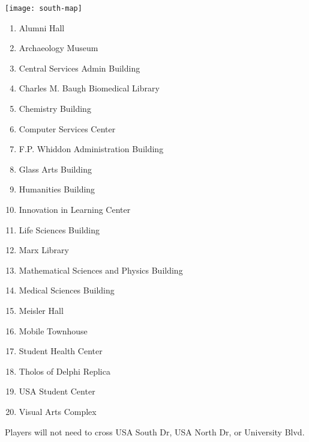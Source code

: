 \documentclass{../puzzlehunt}
\title{\phEventName}
\author{Mathematical Puzzle Programs}
\date{\today}
\begin{document}




\begin{center}
  \texttt{[image: south-map]}
\end{center}

\begin{multicols}{2}
  \begin{enumerate}
    \item Alumni Hall
    \item Archaeology Museum
    \item Central Services Admin Building
    \item Charles M. Baugh Biomedical Library
    \item Chemistry Building
    \item Computer Services Center
    \item F.P. Whiddon Administration Building
    \item Glass Arts Building
    \item Humanities Building
    \item Innovation in Learning Center
    \item Life Sciences Building
    \item Marx Library
    \item Mathematical Sciences and Physics Building
    \item Medical Sciences Building
    \item Meisler Hall
    \item Mobile Townhouse
    \item Student Health Center
    \item Tholos of Delphi Replica
    \item USA Student Center
    \item Visual Arts Complex
  \end{enumerate}
\end{multicols}

Players will not need to cross USA South Dr, USA North Dr, or University Blvd.
\end{document}
